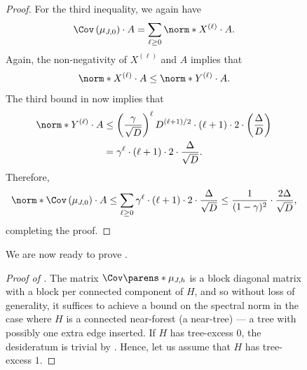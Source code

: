 \documentclass[11pt,letterpaper]{article}
\begin{document}
\begin{figure}
\begin{proof}
        For the third inequality, we again have
        \[ \Cov\left(\mu_{J,0}\right)\cdot A = \sum_{\ell \ge 0} \norm*{X^{(\ell)} \cdot A}. \]
        Again, the non-negativity of $X^{(\ell)}$ and $A$ implies that 
        \[ \norm*{X^{(\ell)} \cdot A} \le \norm*{Y^{(\ell)} \cdot A}. \]
        The third bound in  now implies that
        \begin{align*}
            \norm*{Y^{(\ell)} \cdot A} &\le \left(\frac{\gamma}{\sqrt{D}}\right)^{\ell} D^{(\ell+1)/2} \cdot (\ell+1) \cdot 2 \cdot \left( \frac{\Delta}{D} \right) \\
                &= \gamma^{\ell} \cdot (\ell+1) \cdot 2 \cdot \frac{\Delta}{\sqrt{D}}.
        \end{align*}
        Therefore,
        \[ \norm*{\Cov\left(\mu_{J,0}\right) \cdot A} \le \sum_{\ell \ge 0} \gamma^{\ell} \cdot (\ell+1) \cdot 2 \cdot \frac{\Delta}{\sqrt{D}} \le \frac{1}{(1-\gamma)^2} \cdot \frac{2\Delta}{\sqrt{D}}, \]
        completing the proof.
    \end{proof}

    We are now ready to prove .
    \begin{proof}[Proof of ]
        The matrix $\Cov\parens*{\mu_{J,h}}$ is a block diagonal matrix with a block per connected component of $H$, and so without loss of generality, it suffices to achieve a bound on the spectral norm in the case where $H$ is a connected near-forest (a near-tree) --- a tree with possibly one extra edge inserted. If $H$ has tree-excess $0$, the desideratum is trivial by .
        Hence, let us assume that $H$ has tree-excess $1$.


\end{proof}
\end{figure}
\end{document}
